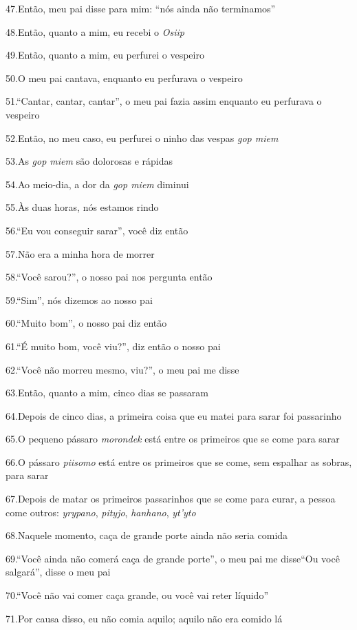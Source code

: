 47.Então, meu pai disse para mim: ``nós ainda não terminamos''

48.Então, quanto a mim, eu recebi o \emph{Osiip}

49.Então, quanto a mim, eu perfurei o vespeiro

50.O meu pai cantava, enquanto eu perfurava o vespeiro

51.``Cantar, cantar, cantar'', o meu pai fazia assim enquanto eu
perfurava o vespeiro

52.Então, no meu caso, eu perfurei o ninho das vespas \emph{gop miem}

53.As \emph{gop miem} são dolorosas e rápidas

54.Ao meio-dia, a dor da \emph{gop miem} diminui

55.Às duas horas, nós estamos rindo

56.``Eu vou conseguir sarar'', você diz então

57.Não era a minha hora de morrer

58.``Você sarou?'', o nosso pai nos pergunta então

59.``Sim'', nós dizemos ao nosso pai

60.``Muito bom'', o nosso pai diz então

61.``É muito bom, você viu?'', diz então o nosso pai

62.``Você não morreu mesmo, viu?'', o meu pai me disse

63.Então, quanto a mim, cinco dias se passaram

64.Depois de cinco dias, a primeira coisa que eu matei para sarar foi
passarinho

65.O pequeno pássaro \emph{morondek} está entre os primeiros que se come
para sarar

66.O pássaro \emph{piisomo} está entre os primeiros que se come, sem
espalhar as sobras, para sarar

67.Depois de matar os primeiros passarinhos que se come para curar, a
pessoa come outros: \emph{yrypano}, \emph{pityjo}, \emph{hanhano},
\emph{yt'yto}

68.Naquele momento, caça de grande porte ainda não seria comida

69.``Você ainda não comerá caça de grande porte'', o meu pai me
disse``Ou você salgará'', disse o meu pai

70.``Você não vai comer caça grande, ou você vai reter líquido''

71.Por causa disso, eu não comia aquilo; aquilo não era comido lá

